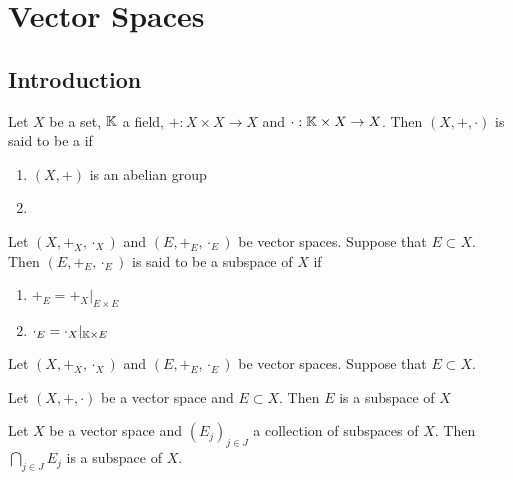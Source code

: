 \documentclass{book}
\begin{document}
	
	
	
	
	
	
	\newpage
	\chapter{Vector Spaces}
	
	\section{Introduction}
	
	\begin{defn}
		Let $X$ be a set, $\mathbb{K}$ a field, $+:X \times X \rightarrow X$ and $\cdot:\mathbb{K} \times X \rightarrow X$. Then $(X, +, \cdot)$ is said to be a  if 
		\begin{enumerate}
			\item $(X, +)$ is an abelian group
			\item 
		\end{enumerate} 
	\end{defn}


	\begin{defn}
		Let $(X, +_X, \cdot_X)$ and $(E, +_E, \cdot_E)$ be vector spaces. Suppose that $E \subset X$. Then $(E, +_E, \cdot_E)$ is said to be a subspace of $X$ if 
		\begin{enumerate}
			\item $+_E = +_X|_{E \times E}$
			\item $\cdot_E = \cdot_X|_{\mathbb{K} \times E}$
		\end{enumerate}
	\end{defn}

	\begin{ex}
		Let $(X, +_X, \cdot_X)$ and $(E, +_E, \cdot_E)$ be vector spaces. Suppose that $E \subset X$. 
	\end{ex}
	
	\begin{ex}
		Let $(X, +, \cdot)$ be a vector space and $E \subset X$. Then $E$ is a subspace of $X$
	\end{ex}
	
	
	\begin{defn}
		Let $X$ be a vector space and $(E_j)_{j \in J}$ a collection of subspaces of $X$. Then $\bigcap\limits_{j \in J}E_j$ is a subspace of $X$. 
	\end{defn}
\end{document}

